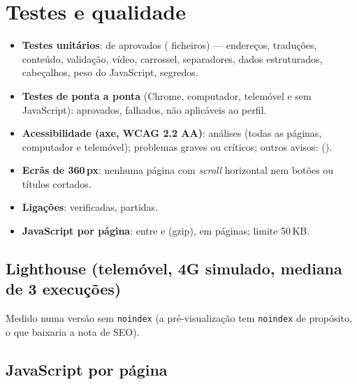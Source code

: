 \documentclass[11pt,a4paper]{article}
\begin{document}
\section{Testes e qualidade}
\begin{itemize}
  \item \textbf{Testes unitários}: \resUnitPassed{} de \resUnitTotal{} aprovados (\resUnitFiles{} ficheiros) --- endereços, traduções, conteúdo, validação, vídeo, carrossel, separadores, dados estruturados, cabeçalhos, peso do JavaScript, segredos.
  \item \textbf{Testes de ponta a ponta} (Chrome, computador, telemóvel e sem JavaScript): \resEtoePassed{} aprovados, \resEtoeFailed{} falhados, \resEtoeSkipped{} não aplicáveis ao perfil.
  \item \textbf{Acessibilidade (axe, WCAG 2.2 AA)}: \resAxeRuns{} análises (todas as páginas, computador e telemóvel); \resAxeSerious{} problemas graves ou críticos; outros avisos: \resAxeOther{} (\resAxeRules).
  \item \textbf{Ecrãs de 360\,px}: nenhuma página com \textit{scroll} horizontal nem botões ou títulos cortados.
  \item \textbf{Ligações}: \resLinksChecked{} verificadas, \resLinksBroken{} partidas.
  \item \textbf{JavaScript por página}: entre \resJsMin{} e \resJsMax{} (gzip), em \resJsPages{} páginas; limite 50\,KB.
\end{itemize}

\subsection{Lighthouse (telemóvel, 4G simulado, mediana de 3 execuções)}
\begin{center}\resLighthouseTable\end{center}
Medido numa versão sem \texttt{noindex} (a pré-visualização tem \texttt{noindex} de propósito, o que baixaria
a nota de SEO).

\subsection{JavaScript por página}
\begin{center}\resJsTable\end{center}

\end{document}
